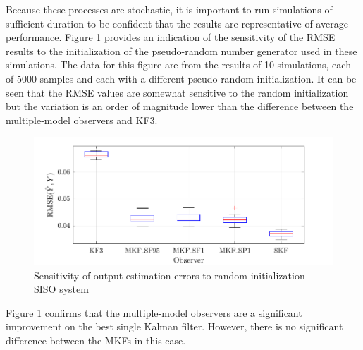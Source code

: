 Because these processes are stochastic, it is important to run simulations of sufficient duration to be confident that the results are representative of average performance. Figure \ref{fig:rod-obs-sim1-yest-all-seed-RMSE-box} provides an indication of the sensitivity of the \gls{RMSE} results to the initialization of the pseudo-random number generator used in these simulations. The data for this figure are from the results of 10 simulations, each of 5000 samples and each with a different pseudo-random initialization. It can be seen that the \gls{RMSE} values are somewhat sensitive to the random initialization but the variation is an order of magnitude lower than the difference between the multiple-model observers and KF3.
\begin{figure}[htp]
	\centering
	\includegraphics[width=12cm]{images/rod_obs_sim1_all_seed_y_err_box.pdf}
	\caption{Sensitivity of output estimation errors to random initialization – SISO system}
	\label{fig:rod-obs-sim1-yest-all-seed-RMSE-box}
\end{figure}
Figure \ref{fig:rod-obs-sim1-yest-all-seed-RMSE-box} confirms that the multiple-model observers are a significant improvement on the best single Kalman filter. However, there is no significant difference between the \gls{MKF}s in this case.
%
%
%

